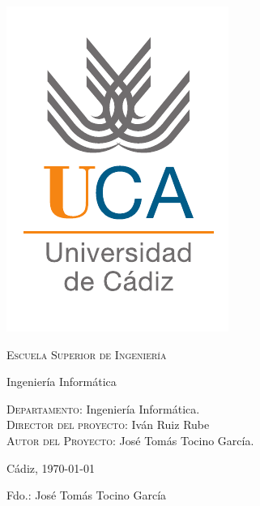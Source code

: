 {
  \thispagestyle{empty}
  \centering
  \includegraphics[width=.2\textwidth]{0_misc/logo_uca}

  \bigskip
  \bigskip
  \bigskip
  
  \begin{changemargin}{2em}{2em}

    \begin{center}
      {\Huge \textsc{\nohyphens{Escuela Superior de Ingeniería}}}
      
      \bigskip
      \bigskip
      
      {\huge \nohyphens{Ingeniería Informática}}
      
      \bigskip
      \bigskip
      \bigskip
      \bigskip
      
      \begin{doublespace}
        {\LARGE \nohyphens{\nombreProyecto}}
      \end{doublespace}


      \bigskip
      \bigskip
      \bigskip
      \bigskip
      
    \end{center}
  \end{changemargin}
  \begin{changemargin}{2em}{1em}
  \begin{flushleft}
    \Large

    \textsc{Departamento}: \nohyphens{Ingeniería Informática.} \\
    \textsc{Director del proyecto}: \nohyphens{Iván Ruiz Rube} \\
    \textsc{Autor del Proyecto}: \nohyphens{José Tomás Tocino García}. \\
  \end{flushleft}

  \end{changemargin}  

  \bigskip
  \bigskip
  \bigskip
  
  \begin{flushright}
    \large
    Cádiz, \today

    \bigskip
    \bigskip
    \bigskip
    \bigskip    
    \bigskip
    \bigskip

    Fdo.: José Tomás Tocino García
    
  \end{flushright}

}




